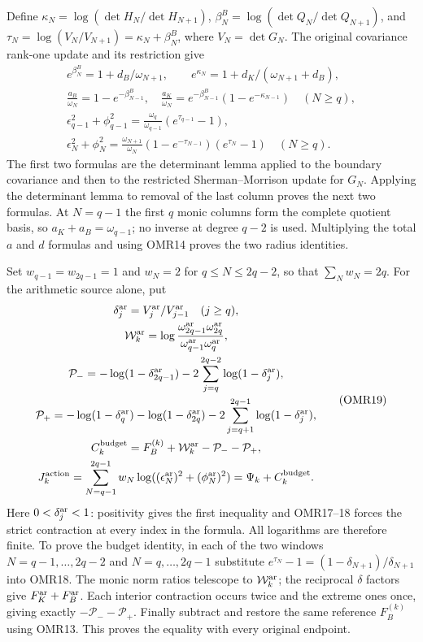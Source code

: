 \documentclass[11pt,a4paper]{article}
\begin{document}
Define $\kappa_N=\log(\det H_N/\det H_{N+1})$,
$\beta_N^B=\log(\det Q_N/\det Q_{N+1})$, and
$\tau_N=\log(V_N/V_{N+1})=\kappa_N+\beta_N^B$,
where $V_N=\det G_N$. The original covariance rank-one update
and its restriction give
\[
 \begin{gathered}
 e^{\beta_N^B}=1+d_B/\omega_{N+1},\qquad
 e^{\kappa_N}=1+d_K/(\omega_{N+1}+d_B),\\
 \frac{a_B}{\omega_N}=1-e^{-\beta_{N-1}^B},\quad
 \frac{a_K}{\omega_N}=e^{-\beta_{N-1}^B}(1-e^{-\kappa_{N-1}})
                    \quad(N\ge q),\\
 \epsilon_{q-1}^2+\phi_{q-1}^2
   =\frac{\omega_q}{\omega_{q-1}}(e^{\tau_{q-1}}-1),\\
 \epsilon_N^2+\phi_N^2
   =\frac{\omega_{N+1}}{\omega_N}
          (1-e^{-\tau_{N-1}})(e^{\tau_N}-1)\quad(N\ge q).
 \end{gathered}\tag{OMR18}
\]
The first two formulas are the determinant lemma applied to the
boundary covariance and then to the restricted Sherman--Morrison
update for $G_N$. Applying the determinant lemma to removal of
the last column proves the next two formulas. At $N=q-1$ the
first $q$ monic columns form the complete quotient basis, so
$a_K+a_B=\omega_{q-1}$; no inverse at degree $q-2$ is used.
Multiplying the total $a$ and $d$ formulas and using OMR14 proves
the two radius identities.

Set $w_{q-1}=w_{2q-1}=1$ and $w_N=2$ for
$q\le N\le2q-2$, so that $\sum_Nw_N=2q$.
For the arithmetic source alone, put
\[
 \begin{gathered}
 \delta_j^{\rm ar}=V_j^{\rm ar}/V_{j-1}^{\rm ar}\quad(j\ge q),\\
 \mathcal W_k^{\rm ar}
   =\log\frac{\omega_{2q-1}^{\rm ar}\omega_{2q}^{\rm ar}}
                    {\omega_{q-1}^{\rm ar}\omega_q^{\rm ar}},\\
 \mathcal P_-=-\log(1-\delta_{2q-1}^{\rm ar})
                 -2\sum_{j=q}^{2q-2}\log(1-\delta_j^{\rm ar}),\\
 \mathcal P_+=-\log(1-\delta_q^{\rm ar})-\log(1-\delta_{2q}^{\rm ar})
                 -2\sum_{j=q+1}^{2q-1}\log(1-\delta_j^{\rm ar}),\\
 C_k^{\rm budget}=F_B^{(k)}+\mathcal W_k^{\rm ar}-\mathcal P_--\mathcal P_+,\\
 J_k^{\rm action}=\sum_{N=q-1}^{2q-1}w_N
                  \log((\epsilon_N^{\rm ar})^2+(\phi_N^{\rm ar})^2)
                  =\Psi_k+C_k^{\rm budget}.
 \end{gathered}\tag{OMR19}
\]
Here $0<\delta_j^{\rm ar}<1$: positivity gives the first
inequality and OMR17--18 forces the strict contraction at every
index in the formula. All logarithms are therefore finite.
To prove the budget identity, in each of the two windows
$N=q-1,\ldots,2q-2$ and $N=q,\ldots,2q-1$ substitute
$e^{\tau_N}-1=(1-\delta_{N+1})/\delta_{N+1}$ into OMR18.
The monic norm ratios telescope to $\mathcal W_k^{\rm ar}$;
the reciprocal $\delta$ factors give $F_K^{\rm ar}+F_B^{\rm ar}$.
Each interior contraction occurs twice and the extreme ones once,
giving exactly $-\mathcal P_--\mathcal P_+$. Finally subtract
and restore the same reference $F_B^{(k)}$ using OMR13.
This proves the equality with every original endpoint.
\end{document}
